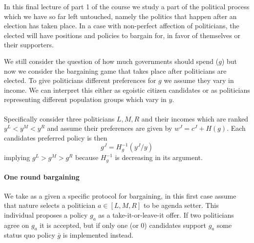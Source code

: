 In this final lecture of part 1 of the course we study a part of the political process which we have so far left untouched, namely the politics that happen after an election has taken place. In a case with non-perfect affection of politicians, the elected will have positions and policies to bargain for, in favor of themselves or their supporters.

We still consider the question of how much governments should spend ($g$) but now we consider the bargaining game that takes place after politicians are elected. To give politicians different preferences for $g$ we assume they vary in income. We can interpret this either as egoistic citizen candidates or as politicians representing different population groups which vary in $y$.
\\ \\
Specifically consider three politicians $L,M,R$ and their incomes which are ranked $y^L < y^M < y^R$ and assume their preferences are given by $w^J=c^J + H(g)$. Each candidates preferred policy is then 
\begin{equation}
    g^J = H_g^{-1}(y^J / y)
\end{equation}
implying $g^L > g^M > g^R$ because $H_g^{-1}$ is decreasing in its argument.

\paragraph{One round bargaining} We take as a given a specific protocol for bargaining, in this first case assume that nature selects a politician $a\in[L,M,R]$ to be agenda setter. This individual proposes a policy $g_a$ as a take-it-or-leave-it offer. If two politicians agree on $g_a$ it is accepted, but if only one (or 0) candidates support $g_a$ some status quo policy $\bar{g}$ is implemented instead.

